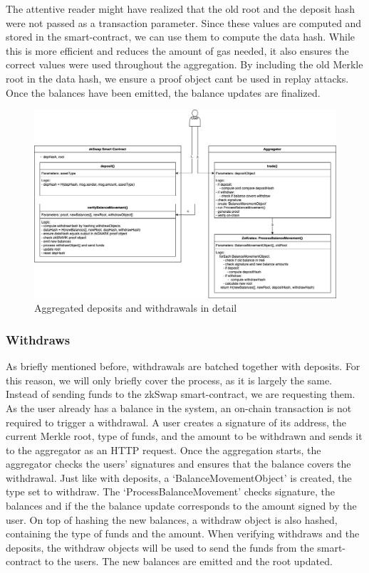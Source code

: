 \documentclass[../../thesis.tex]{subfiles}
\begin{document}
The attentive reader might have realized that the old root and the deposit hash were not passed as a transaction parameter. Since these values are computed and stored in the smart-contract, we can use them to compute the data hash. While this is more efficient and reduces the amount of gas needed, it also ensures the correct values were used throughout the aggregation. By including the old Merkle root in the data hash, we ensure a proof object cant be used in replay attacks. Once the balances have been emitted, the balance updates are finalized. 

\begin{figure}[h]
    \centerline{\includegraphics[totalheight=8cm]{diagrams/depositWithdrawAggregated.png}}
    \caption{Aggregated deposits and withdrawals in detail}
    \label{fig:depWithAggr}
\end{figure}

\subsubsection{Withdraws} \label{with}
As briefly mentioned before, withdrawals are batched together with deposits. For this reason, we will only briefly cover the process, as it is largely the same. Instead of sending funds to the zkSwap smart-contract, we are requesting them. As the user already has a balance in the system, an on-chain transaction is not required to trigger a withdrawal. A user creates a signature of its address, the current Merkle root, type of funds, and the amount to be withdrawn and sends it to the aggregator as an HTTP request. Once the aggregation starts, the aggregator checks the users' signatures and ensures that the balance covers the withdrawal. Just like with deposits, a `BalanceMovementObject' is created, the type set to withdraw. The `ProcessBalanceMovement' checks signature, the balances and if the the balance update corresponds to the amount signed by the user. On top of hashing the new balances, a withdraw object is also hashed, containing the type of funds and the amount. When verifying withdraws and the deposits, the withdraw objects will be used to send the funds from the smart-contract to the users. The new balances are emitted and the root updated. 
\end{document}
